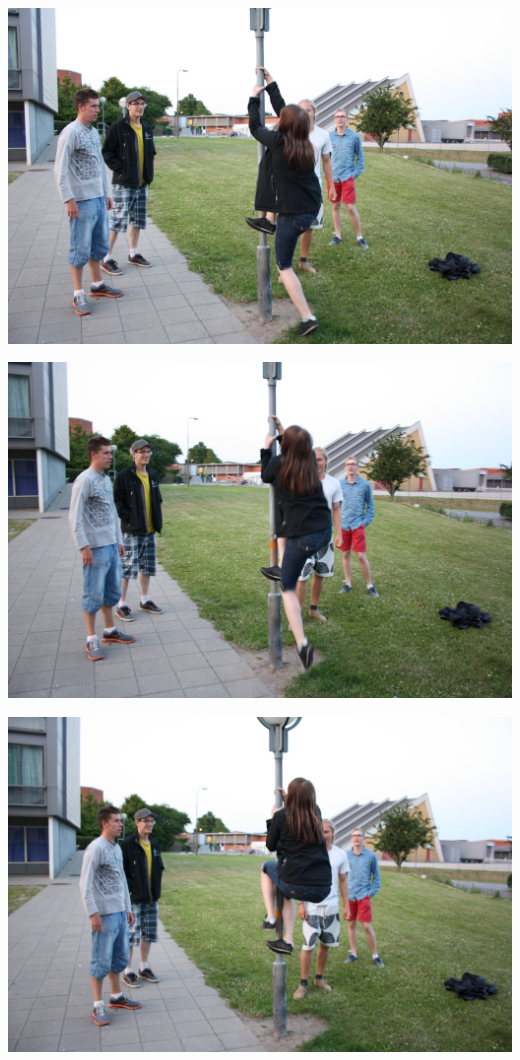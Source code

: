 \begin{minipage}[t]{120mm}
\vspace{3mm}
\includegraphics[width=\linewidth]{Alicia1.jpg}

\includegraphics[width=\linewidth]{Alicia2.jpg}

\includegraphics[width=\linewidth]{Alicia3.jpg}

\end{minipage}
